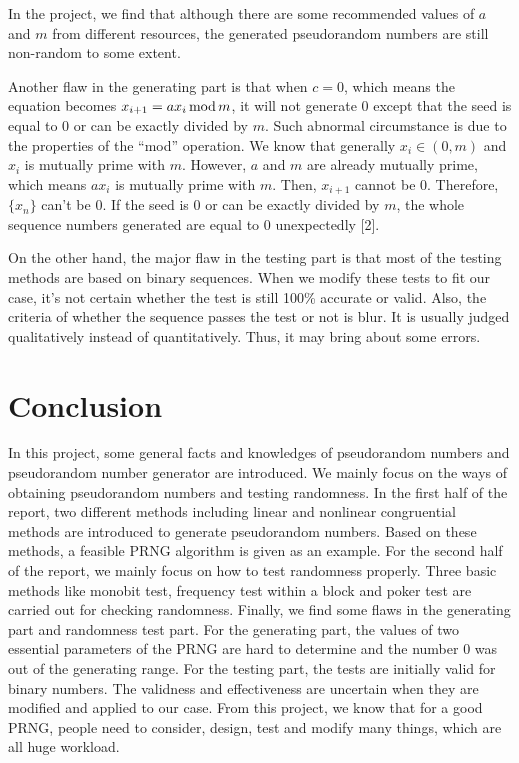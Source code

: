 \documentclass[a4paper]{article}
\begin{document}
	In the project, we find that although there are some recommended values of $a$ and $m$ from different resources, the generated pseudorandom numbers are still non-random to some extent. 
	
	Another flaw in the generating part is that when $c=0$, which means the equation becomes $x_{i+1}=ax_i\,{\rm mod}\,m$, it will not generate 0 except that the seed is equal to 0 or can be exactly divided by $m$. Such abnormal circumstance is due to the properties of the “mod” operation. We know that generally $x_i\in (0,m)$ and $x_i$ is mutually prime with $m$. However, $a$ and $m$ are already mutually prime, which means $ax_i$ is mutually prime with $m$. Then, $x_{i+1}$ cannot be 0. Therefore, $\{x_n\}$ can't be 0. If the seed is 0 or can be exactly divided by $m$, the whole sequence numbers generated are equal to 0 unexpectedly [2].
	
	On the other hand, the major flaw in the testing part is that most of the testing methods are based on binary sequences. When we modify these tests to fit our case, it's not certain whether the test is still 100\% accurate or valid. Also, the criteria of whether the sequence passes the test or not is blur. It is usually judged qualitatively instead of quantitatively. Thus, it may bring about some errors.

\section{Conclusion}

	In this project, some general facts and knowledges of pseudorandom numbers and pseudorandom number generator are introduced. We mainly focus on the ways of obtaining pseudorandom numbers and testing randomness. In the first half of the report, two different methods including linear and nonlinear congruential methods are introduced to generate pseudorandom numbers. Based on these methods, a feasible PRNG algorithm is given as an example. For the second half of the report, we mainly focus on how to test randomness properly. Three basic methods like monobit test, frequency test within a block and poker test are carried out for checking randomness. Finally, we find some flaws in the generating part and randomness test part. For the generating part, the values of two essential parameters of the PRNG are hard to determine and the number 0 was out of the generating range. For the testing part, the tests are initially valid for binary numbers. The validness and effectiveness are uncertain when they are modified and applied to our case. From this project, we know that for a good PRNG, people need to consider, design, test and modify many things, which are all huge workload.
\end{document}
